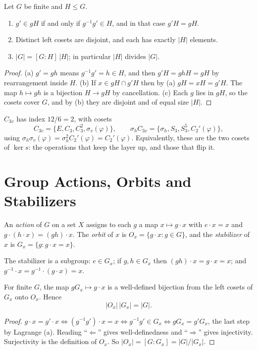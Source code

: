 \begin{theorem}[Lagrange]
Let $G$ be finite and $H\le G$.
\begin{enumerate}
    \item $g'\in gH$ if and only if $g^{-1}g'\in H$, and in that case $g'H = gH$.
    \item Distinct left cosets are disjoint, and each has exactly $|H|$ elements.
    \item $|G| = [G:H]\,|H|$; in particular $|H|$ divides $|G|$.
\end{enumerate}
\end{theorem}
\begin{proof}
(a) $g' = gh$ means $g^{-1}g' = h\in H$, and then $g'H = ghH = gH$ by rearrangement inside $H$. (b) If $x\in gH\cap g'H$ then by (a) $gH = xH = g'H$. The map $h\mapsto gh$ is a bijection $H\to gH$ by cancellation. (c) Each $g$ lies in $gH$, so the cosets cover $G$, and by (b) they are disjoint and of equal size $|H|$.
\end{proof}

\begin{example}[Cosets of $C_{3v}$ in $D_{3h}$]
$C_{3v}$ has index $12/6 = 2$, with cosets
\[
    C_{3v} = \{E, C_3, C_3^2, \sigma_v(\varphi)\},\qquad \sigma_hC_{3v} = \{\sigma_h, S_3, S_3^5, C_2'(\varphi)\},
\]
using $\sigma_h\sigma_v(\varphi) = \sigma_h^2C_2'(\varphi) = C_2'(\varphi)$. Equivalently, these are the two cosets of $\ker s$: the operations that keep the layer up, and those that flip it.
\end{example}

\section{Group Actions, Orbits and Stabilizers}

\begin{definition}
An \emph{action} of $G$ on a set $X$ assigns to each $g$ a map $x\mapsto g\cdot x$ with $e\cdot x = x$ and $g\cdot(h\cdot x) = (gh)\cdot x$. The \emph{orbit} of $x$ is $O_x = \{g\cdot x : g\in G\}$, and the \emph{stabilizer} of $x$ is $G_x = \{g : g\cdot x = x\}$.
\end{definition}

The stabilizer is a subgroup: $e\in G_x$; if $g,h\in G_x$ then $(gh)\cdot x = g\cdot x = x$; and $g^{-1}\cdot x = g^{-1}\cdot(g\cdot x) = x$.

\begin{theorem}
For finite $G$, the map $gG_x\mapsto g\cdot x$ is a well-defined bijection from the left cosets of $G_x$ onto $O_x$. Hence
\begin{equation}
    |O_x|\,|G_x| = |G|.
    \label{eq:groups-orbit-stabilizer}
\end{equation}
\end{theorem}
\begin{proof}
$g\cdot x = g'\cdot x \iff (g^{-1}g')\cdot x = x \iff g^{-1}g'\in G_x \iff gG_x = g'G_x$, the last step by Lagrange (a). Reading ``$\Leftarrow$'' gives well-definedness and ``$\Rightarrow$'' gives injectivity. Surjectivity is the definition of $O_x$. So $|O_x| = [G:G_x] = |G|/|G_x|$.
\end{proof}

